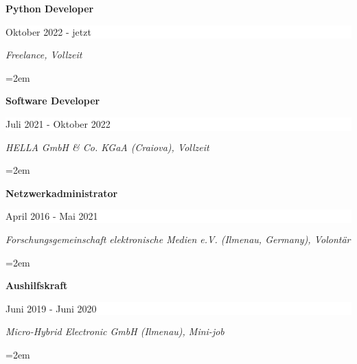 \documentclass[paper=a4,fontsize=10.47pt]{scrartcl} %
\newcommand{\sepspace}{\vspace*{0.5em}}		%
\newcommand{\EducationEntry}[4]{
		\noindent \textbf{#1} \hfill      %
		\colorbox{White}{%
			\parbox{16em}{%
			\hfill\color{Black}#2}} \par  %
		\noindent \textit{#3} \par        %
		\noindent\hangindent=2em\hangafter=0 \small #4 %
		\normalsize \par}
\begin{document}
\EducationEntry{\color[HTML]{6a040f}Python Developer}{Oktober 2022 - jetzt}{Freelance, Vollzeit}{%
}
\sepspace
\EducationEntry{\color[HTML]{6a040f}Software Developer}{Juli 2021 - Oktober 2022}{HELLA GmbH \& Co. KGaA (Craiova), Vollzeit}{%
}
\sepspace
\EducationEntry{\color[HTML]{6a040f}Netzwerkadministrator}{April 2016 - Mai 2021}{Forschungsgemeinschaft elektronische Medien e.V. (Ilmenau, Germany), Volontär}{%
}
\sepspace
\EducationEntry{\color[HTML]{6a040f}Aushilfskraft}{Juni 2019 - Juni 2020}{Micro-Hybrid Electronic GmbH (Ilmenau), Mini-job}{%
%
}
\end{document}
